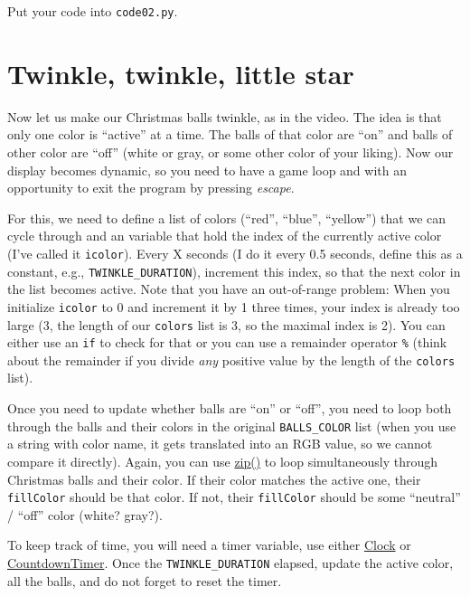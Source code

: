 \documentclass[
]{book}
\begin{document}
Put your code into \texttt{code02.py}.

\hypertarget{twinkle-twinkle-little-star}{%
\section{Twinkle, twinkle, little star}\label{twinkle-twinkle-little-star}}

Now let us make our Christmas balls twinkle, as in the video. The idea is that only one color is ``active'' at a time. The balls of that color are ``on'' and balls of other color are ``off'' (white or gray, or some other color of your liking). Now our display becomes dynamic, so you need to have a game loop and with an opportunity to exit the program by pressing \emph{escape}.

For this, we need to define a list of colors (``red'', ``blue'', ``yellow'') that we can cycle through and an variable that hold the index of the currently active color (I've called it \texttt{icolor}). Every X seconds (I do it every 0.5 seconds, define this as a constant, e.g., \texttt{TWINKLE\_DURATION}), increment this index, so that the next color in the list becomes active. Note that you have an out-of-range problem: When you initialize \texttt{icolor} to 0 and increment it by 1 three times, your index is already too large (3, the length of our \texttt{colors} list is 3, so the maximal index is 2). You can either use an \texttt{if} to check for that or you can use a remainder operator \texttt{\%} (think about the remainder if you divide \emph{any} positive value by the length of the \texttt{colors} list).

Once you need to update whether balls are ``on'' or ``off'', you need to loop both through the balls and their colors in the original \texttt{BALLS\_COLOR} list (when you use a string with color name, it gets translated into an RGB value, so we cannot compare it directly). Again, you can use \href{https://docs.python.org/3/library/functions.html\#zip}{zip()} to loop simultaneously through Christmas balls and their color. If their color matches the active one, their \texttt{fillColor} should be that color. If not, their \texttt{fillColor} should be some ``neutral'' / ``off'' color (white? gray?).

To keep track of time, you will need a timer variable, use either \href{https://psychopy.org/api/clock.html\#psychopy.clock.Clock}{Clock} or \href{https://psychopy.org/api/clock.html\#psychopy.clock.CountdownTimer}{CountdownTimer}. Once the \texttt{TWINKLE\_DURATION} elapsed, update the active color, all the balls, and do not forget to reset the timer.
\end{document}
